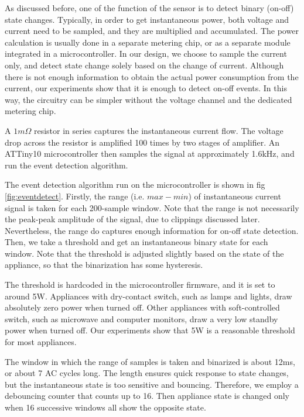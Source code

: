 As discussed before, one of the function of the sensor is to detect binary (on-off) state changes. Typically, in order to get instantaneous power, both voltage and current need to be sampled, and they are multiplied and accumulated. The power calculation is usually done in a separate metering chip, or as a separate module integrated in a microcontroller. In our design, we choose to sample the current only, and detect state change solely based on the change of current. Although there is not enough information to obtain the actual power consumption from the current, our experiments show that it is enough to detect on-off events. In this way, the circuitry can be simpler without the voltage channel and the dedicated metering chip. 

A $1m\Omega$ resistor in series captures the instantaneous current flow. The voltage drop across the resistor is amplified 100 times by two stages of amplifier. An ATTiny10 microcontroller then samples the signal at approximately 1.6kHz, and run the event detection algorithm. 

The event detection algorithm run on the microcontroller is shown in fig \ref{fig:eventdetect}. Firstly, the range (i.e. $max - min$) of instantaneous current signal is taken for each 200-sample window. Note that the range is not necessarily the peak-peak amplitude of the signal, due to clippings discussed later. Nevertheless, the range do captures enough information for on-off state detection. Then, we take a threshold and get an instantaneous binary state for each window. Note that the threshold is adjusted slightly based on the state of the appliance, so that the binarization has some hysteresis. 

The threshold is hardcoded in the microcontroller firmware, and it is set to around 5W. Appliances with dry-contact switch, such as lamps and lights, draw absolutely zero power when turned off. Other appliances with soft-controlled switch, such as microwave and computer monitors, draw a very low standby power when turned off. Our experiments show that 5W is a reasonable threshold for most appliances. 

The window in which the range of samples is taken and binarized is about 12ms, or about 7 AC cycles long. The length ensures quick response to state changes, but the instantaneous state is too sensitive and bouncing. Therefore, we employ a debouncing counter that counts up to 16. Then appliance state is changed only when 16 successive windows all show the opposite state. 

